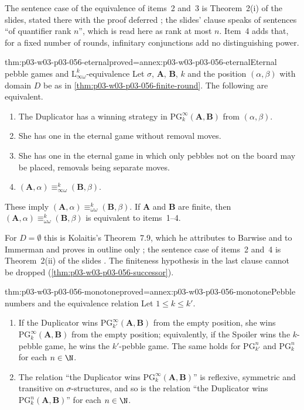 The sentence case of the equivalence of items~2 and~3 is Theorem~2(i) of the
slides, stated there with the proof deferred
\cite[p.~13]{TechnionLMC2009Lecture4}; the slides' clause speaks of
sentences ``of quantifier rank \(n\)'', which is read here as rank at most
\(n\). Item~4 adds that, for a fixed number of rounds, infinitary
conjunctions add no distinguishing power.

\begin{hbtheorem}{thm:p03-w03-p03-056-eternal}{proved=annex:p03-w03-p03-056-eternal}{Eternal pebble games and \(\mathrm{L}^k_{\infty\omega}\)-equivalence}
Let \(\sigma\), \(\mathbf A\), \(\mathbf B\), \(k\) and the position
\((\alpha,\beta)\) with domain \(D\) be as in
\cref{thm:p03-w03-p03-056-finite-round}. The following are equivalent.
\begin{enumerate}
\item The Duplicator has a winning strategy in
      \(\mathrm{PG}^\infty_k(\mathbf A,\mathbf B)\) from \((\alpha,\beta)\).
\item She has one in the eternal game without removal moves.
\item She has one in the eternal game in which only pebbles not on the
      board may be placed, removals being separate moves.
\item \((\mathbf A,\alpha)\equiv^k_{\infty\omega}(\mathbf B,\beta)\).
\end{enumerate}
These imply \((\mathbf A,\alpha)\equiv^k_{\omega\omega}(\mathbf B,\beta)\).
If \(\mathbf A\) and \(\mathbf B\) are finite, then
\((\mathbf A,\alpha)\equiv^k_{\omega\omega}(\mathbf B,\beta)\) is equivalent
to items~1--4.
\end{hbtheorem}

For \(D=\emptyset\) this is Kolaitis's Theorem~7.9, which he attributes to
Barwise and to Immerman and proves in outline only
\cite[Thm.~7.9, pp.~58--59]{Kolaitis2003ExpressivePowerNotes}; the
sentence case of items~2 and~4 is Theorem~2(ii) of the slides
\cite[p.~13]{TechnionLMC2009Lecture4}. The finiteness hypothesis in the last
clause cannot be dropped (\cref{thm:p03-w03-p03-056-successor}).

\begin{hbcorollary}{thm:p03-w03-p03-056-monotone}{proved=annex:p03-w03-p03-056-monotone}{Pebble numbers and the equivalence relation}
Let \(1\leq k\leq k'\).
\begin{enumerate}
\item If the Duplicator wins \(\mathrm{PG}^\infty_{k'}(\mathbf A,\mathbf B)\)
      from the empty position, she wins
      \(\mathrm{PG}^\infty_k(\mathbf A,\mathbf B)\) from the empty position;
      equivalently, if the Spoiler wins the \(k\)-pebble game, he wins the
      \(k'\)-pebble game. The same holds for
      \(\mathrm{PG}^n_{k'}\) and \(\mathrm{PG}^n_k\) for each \(n\in\N\).
\item The relation ``the Duplicator wins
      \(\mathrm{PG}^\infty_k(\mathbf A,\mathbf B)\)'' is reflexive, symmetric
      and transitive on \(\sigma\)-structures, and so is the relation ``the
      Duplicator wins \(\mathrm{PG}^n_k(\mathbf A,\mathbf B)\)'' for each
      \(n\in\N\).
\end{enumerate}
\end{hbcorollary}

